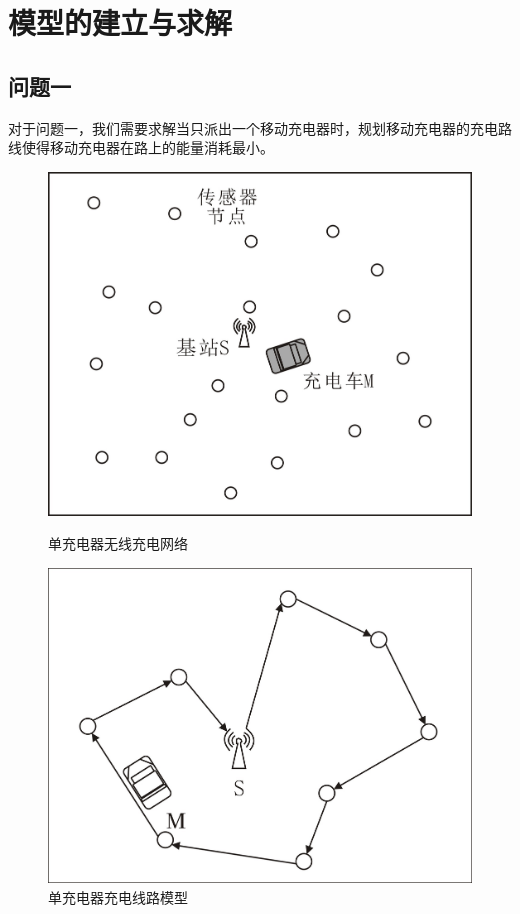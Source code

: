 \documentclass{article}
\begin{document}
\newpage                                                    %
\section{模型的建立与求解}
\subsection{问题一}
对于问题一，我们需要求解当只派出一个移动充电器时，规划移动充电器的充电路线使得移动充电器在路上的能量消耗最小。\\
\vspace{0.5ex}
\begin{figure}[hbt]
	\begin{minipage}[t]{0.5\textwidth}
		\centering
		\includegraphics[scale=0.5]{3.jpg}
		\caption{单充电器无线充电网络}
	\end{minipage}
	\qquad
	\begin{minipage}[t]{0.5\textwidth}
		\centering
		\includegraphics[scale=0.5]{4.jpg}
		\caption{单充电器充电线路模型}
	\end{minipage}
\end{figure}
\vspace{0.5ex}
\end{document}
